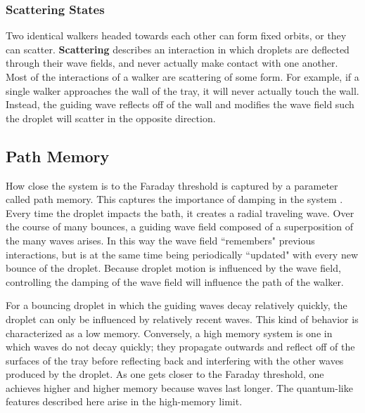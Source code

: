             \subsubsection{Scattering States}
            Two identical walkers headed towards each other can form fixed orbits, or they can scatter. \textbf{Scattering} describes an interaction in which droplets are deflected through their wave fields, and never actually make contact with one another. Most of the interactions of a walker are scattering of some form. For example, if a single walker approaches the wall of the tray, it will never actually touch the wall. Instead, the guiding wave reflects off of the wall and modifies the wave field such the droplet will scatter in the opposite direction.           





 
            \subsection{Path Memory}
                        
            How close the system is to the Faraday threshold is captured by a parameter called path memory. This captures the importance of damping in the system . Every time the droplet impacts the bath, it creates a radial traveling wave. Over the course of many bounces, a guiding wave field composed of a superposition of the many waves arises. In this way the wave field ``remembers" previous interactions, but is at the same time being periodically ``updated" with every new bounce of the droplet. Because droplet motion is influenced by the wave field, controlling the damping of the wave field will influence the path of the walker. 
            
For a bouncing droplet in which the guiding waves decay relatively quickly, the droplet can only be influenced by relatively recent waves. This kind of behavior is characterized as a low memory. Conversely, a high memory system is one in which waves do not decay quickly; they propagate outwards and reflect off of the surfaces of the tray before reflecting back and interfering with the other waves produced by the droplet. As one gets closer to the Faraday threshold, one achieves higher and higher memory because waves last longer. The quantum-like features described here arise in the high-memory limit. 

